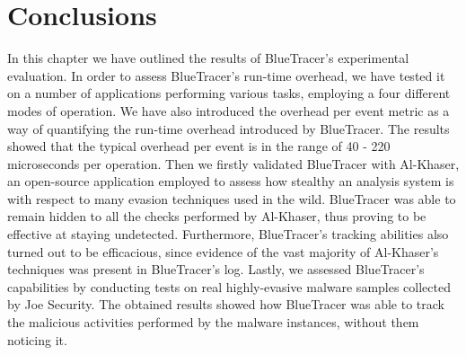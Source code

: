 \section{Conclusions}
In this chapter we have outlined the results of BlueTracer's experimental evaluation. In order to assess BlueTracer's run-time overhead, we have tested it on a number of applications performing various tasks, employing a four different modes of operation. We have also introduced the overhead per event metric as a way of quantifying the run-time overhead introduced by BlueTracer. The results showed that the typical overhead per event is in the range of 40 - 220 microseconds per operation.
Then we firstly validated BlueTracer with Al-Khaser, an open-source application employed to assess how stealthy an analysis system is with respect to many evasion techniques used in the wild. BlueTracer was able to remain hidden to all the checks performed by Al-Khaser, thus proving to be effective at staying undetected. Furthermore, BlueTracer's tracking abilities also turned out to be efficacious, since evidence of the vast majority of Al-Khaser's techniques was present in BlueTracer's log. Lastly, we assessed BlueTracer's capabilities by conducting tests on real highly-evasive malware samples collected by Joe Security. The obtained results showed how BlueTracer was able to track the malicious activities performed by the malware instances, without them noticing it.